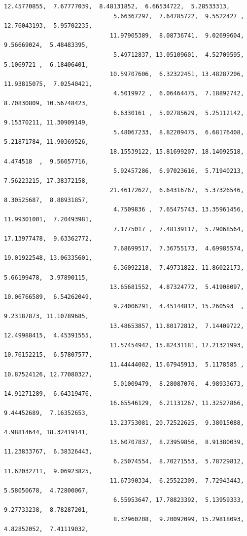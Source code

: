 \documentclass[11pt]{article}
\begin{document}
\begin{Verbatim}[commandchars=\\\{\}]
                              12.45770855,  7.67777039,  8.48131852,  6.66534722,  5.28533313,
                               5.66367297,  7.64785722,  9.5522427 , 12.76043193,  5.95702235,
                              11.97905389,  8.08736741,  9.02699604,  9.56669024,  5.48483395,
                               5.49712837, 13.05109601,  4.52709595,  5.1069721 ,  6.18406401,
                              10.59707606,  6.32322451, 13.48287206, 11.93815075,  7.02540421,
                               4.5019972 ,  6.06464475,  7.18892742,  8.70830809, 10.56748423,
                               6.6330161 ,  5.02785629,  5.25112142,  9.15370211, 11.30909149,
                               5.48067233,  8.82209475,  6.68176408,  5.21871784, 11.90369526,
                              18.15539122, 15.81699207, 18.14092518,  4.474518  ,  9.56057716,
                               5.92457286,  6.97023616,  5.71940213,  7.56223215, 17.38372158,
                              21.46172627,  6.64316767,  5.37326546,  8.30525687,  8.88931857,
                               4.7509836 ,  7.65475743, 13.35961456, 11.99301001,  7.20493981,
                               7.1775017 ,  7.48139117,  5.79068564, 17.13977478,  9.63362772,
                               7.68699517,  7.36755173,  4.69985574, 19.01922548, 13.06335601,
                               6.36092218,  7.49731822, 11.86022173,  5.66199478,  3.97890115,
                              13.65681552,  4.87324772,  5.41908097, 10.06766589,  6.54262049,
                               9.24006291,  4.45144812, 15.260593  ,  9.23187873, 11.10789685,
                              13.48653857, 11.80172812,  7.14409722, 12.49988415,  4.45391555,
                              11.57454942, 15.82431181, 17.21321993, 10.76152215,  6.57807577,
                              11.44444002, 15.67945913,  5.1178585 , 10.87524126, 12.77080327,
                               5.01009479,  8.28087076,  4.98933673, 14.91271289,  6.64319476,
                              16.65546129,  6.21131267, 11.32527866,  9.44452689,  7.16352653,
                              13.23753081, 20.72522625,  9.38015088,  4.98814644, 18.32419141,
                              13.60707837,  8.23959856,  8.91380039, 11.23833767,  6.38326443,
                               6.25074554,  8.70271553,  5.78729812, 11.62032711,  9.06923825,
                              11.67390334,  6.25522309,  7.72943443,  5.58050678,  4.72800067,
                               6.55953647, 17.78823392,  5.13959333,  9.27733238,  8.78287201,
                               8.32960208,  9.20092099, 15.29818093,  4.82852052,  7.41119032,

\end{Verbatim}
\end{document}
